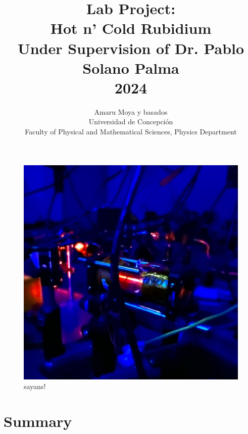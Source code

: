 \documentclass[10pt]{article}
\title{Lab Project:\\ \textbf{Hot n' Cold Rubidium}\\\Large{ Under Supervision of Dr. Pablo Solano Palma \\ 2024}}
\author{Amaru Moya y basados \\ Universidad de Concepción\\ Faculty of Physical and Mathematical Sciences, Physics Department}
\begin{document}
\maketitle
\thispagestyle{fancy}

\begin{figure}[h]
    \centering
    \includegraphics[width=.5\linewidth]{img/resonancia.jpeg}
    \caption{sayans! }
    \label{fig:portada}
\end{figure}

\clearpage

\fancyfoot[C]{\thepage}






\section*{Summary}

\end{document}
